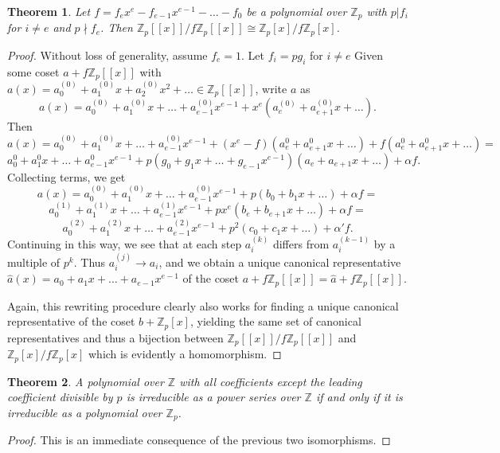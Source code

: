 \documentclass{article}
\newtheorem{theorem}{Theorem}
\begin{document}
\begin{theorem} \label{iso2}
Let $f=f_ex^e - f_{e-1}x^{e-1} - \ldots - f_0$ be a polynomial over $\mathbb{Z}_p$ with $p | f_i$ for $i \ne e$ and $p \nmid f_e$.  Then $\mathbb{Z}_p[[x]]/f\mathbb{Z}_p[[x]] \cong \mathbb{Z}_p[x]/f\mathbb{Z}_p[x]$.
\end{theorem}
\begin{proof}
Without loss of generality, assume $f_e = 1$.  Let $f_i = pg_i$ for $i \ne e$ Given some coset $a + f\mathbb{Z}_p[[x]]$ with $a(x) = a_0^{(0)} + a_1^{(0)}x + a_2^{(0)}x^2 + \ldots \in \mathbb{Z}_p[[x]]$, write $a$ as $$a(x) = a_0^{(0)} + a_1^{(0)}x + \ldots + a_{e-1}^{(0)}x^{e-1} + x^e(a_e^{(0)} + a_{e+1}^{(0)}x + \ldots).$$  Then $$a(x) = a_0^{(0)} + a_1^{(0)}x + \ldots + a_{e-1}^{(0)}x^{e-1} + (x^e - f)(a_e^{0} + a_{e+1}^{0}x + \ldots) + f(a_e^{0} + a_{e+1}^{0}x + \ldots) = $$
$$a_0^{0} + a_1^{0}x + \ldots + a_{e-1}^{0}x^{e-1} + p(g_0 + g_1x + \ldots + g_{e-1}x^{e-1})(a_e + a_{e+1}x + \ldots) + \alpha f.$$  Collecting terms, we get $$a(x) = a_0^{(0)} + a_1^{(0)}x + \ldots + a_{e-1}^{(0)}x^{e-1} + p(b_0 + b_1x + \ldots) + \alpha f = $$
$$a_0^{(1)} + a_1^{(1)}x + \ldots + a_{e-1}^{(1)}x^{e-1} + px^e(b_e + b_{e+1}x + \dots) + \alpha f =$$
$$a_0^{(2)} + a_1^{(2)}x + \ldots + a_{e-1}^{(2)}x^{e-1} + p^2(c_0 + c_1x + \ldots) + \alpha'f.$$  Continuing in this way, we see that at each step $a_i^{(k)}$ differs from $a_i^{(k-1)}$ by a multiple of $p^k$.  Thus $a_i^{(j)} \to a_i$, and we obtain a unique canonical representative $\hat{a}(x) = a_0 + a_1x + \ldots + a_{e-1}x^{e-1}$ of the coset $a + f\mathbb{Z}_p[[x]] = \hat{a} + f\mathbb{Z}_p[[x]]$.

Again, this rewriting procedure clearly also works for finding a unique canonical representative of the coset $b + \mathbb{Z}_p[x]$, yielding the same set of canonical representatives and thus a bijection between $\mathbb{Z}_p[[x]]/f\mathbb{Z}_p[[x]]$ and $\mathbb{Z}_p[x]/f\mathbb{Z}_p[x]$ which is evidently a homomorphism.
\end{proof}

\begin{theorem}
A polynomial over $\mathbb{Z}$ with all coefficients except the leading coefficient divisible by $p$ is irreducible as a power series over $\mathbb{Z}$ if and only if it is irreducible as a polynomial over $\mathbb{Z}_p$.
\end{theorem}
\begin{proof}
This is an immediate consequence of the previous two isomorphisms.
\end{proof}
\end{document}
